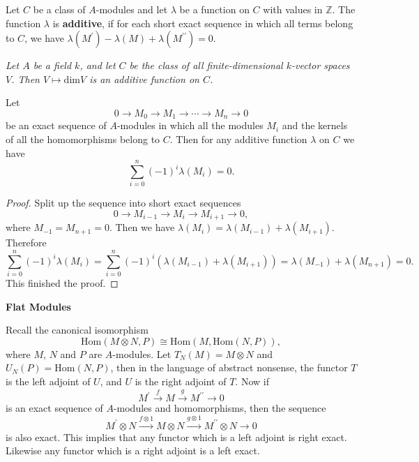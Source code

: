 Let $C$ be a class of $A$-modules and let $\lambda$ be a function on $C$ with values in $\mathbb{Z}$. The function $\lambda$ is \textbf{additive}, if for each short exact sequence in which all terms belong to $C$, we have $\lambda(M^\prime)-\lambda(M)+\lambda(M^{\prime\prime})=0$.
\begin{example}\em
Let $A$ be a field $k$, and let $C$ be the class of all finite-dimensional $k$-vector spaces $V$. Then $V\mapsto\mathrm{dim}V$ is an additive function on $C$.
\end{example}
\begin{proposition}
Let 
$$
0\longrightarrow M_0\longrightarrow M_1\longrightarrow \cdots \longrightarrow M_n\longrightarrow 0
$$
be an exact sequence of $A$-modules in which all the modules $M_i$ and the kernels of all the homomorphisms belong to $C$. Then for any additive function $\lambda$ on $C$ we have 
$$\sum_{i=0}^n(-1)^i\lambda(M_i)=0.$$
\end{proposition}
\begin{proof}
Split up the sequence into short exact sequences 
$$
0\longrightarrow M_{i-1}\longrightarrow M_i\longrightarrow M_{i+1}\longrightarrow 0,
$$
where $M_{-1}=M_{n+1}=0$. Then we have $\lambda(M_i)=\lambda(M_{i-1})+\lambda(M_{i+1})$. Therefore 
$$
\sum_{i=0}^n{\left( -1 \right) ^i\lambda \left( M_i \right)}=\sum_{i=0}^n{\left( -1 \right) ^i\left( \lambda \left( M_{i-1} \right) +\lambda \left( M_{i+1} \right) \right)}=\lambda \left( M_{-1} \right) +\lambda \left( M_{n+1} \right) =0.
$$
This finished the proof.
\end{proof}
\begin{center}
\begin{large}
    \textbf{Flat Modules}
\end{large}
\end{center}
Recall the canonical isomorphism 
$$\mathrm{Hom}(M\otimes N,P)\cong\mathrm{Hom}(M,\mathrm{Hom}(N,P)),$$
where $M$, $N$ and $P$ are $A$-modules. Let $T_N(M)=M\otimes N$ and $U_N(P)=\mathrm{Hom}(N,P)$, then in the language of abstract nonsense, the functor $T$ is the left adjoint of $U$, and $U$ is the right adjoint of $T$. Now if 
$$
M^{\prime}\overset{f}{\longrightarrow}M\overset{g}{\longrightarrow}M^{\prime\prime}\longrightarrow 0
$$
is an exact sequence of $A$-modules and homomorphisms, then the sequence 
$$
M^{\prime}\otimes N\overset{f\otimes 1}{\longrightarrow}M\otimes N\overset{g\otimes 1}{\longrightarrow}M^{\prime\prime}\otimes N\longrightarrow 0
$$
is also exact. This implies that any functor which is a left adjoint is right exact. Likewise any functor which is a right adjoint is a left exact.\par
